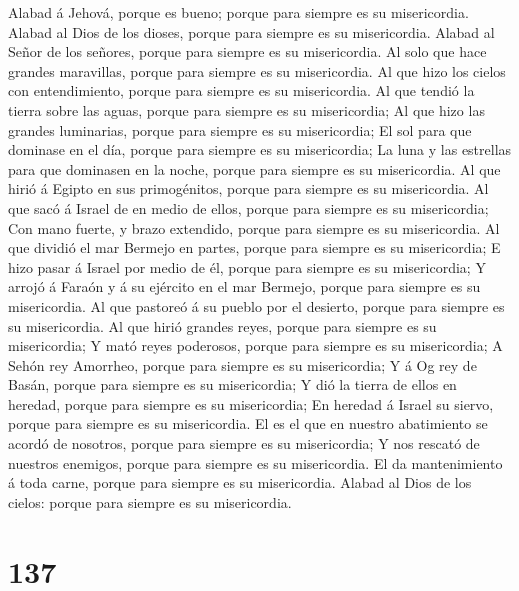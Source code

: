  Alabad á Jehová, porque es bueno; porque para siempre es su
misericordia.  Alabad al Dios de los dioses, porque para
siempre es su misericordia.  Alabad al Señor de los señores,
porque para siempre es su misericordia.  Al solo que hace
grandes maravillas, porque para siempre es su misericordia. 
Al que hizo los cielos con entendimiento, porque para siempre es su
misericordia.  Al que tendió la tierra sobre las aguas,
porque para siempre es su misericordia;  Al que hizo las
grandes luminarias, porque para siempre es su misericordia; 
El sol para que dominase en el día, porque para siempre es su
misericordia;  La luna y las estrellas para que dominasen en
la noche, porque para siempre es su misericordia.  Al que
hirió á Egipto en sus primogénitos, porque para siempre es su
misericordia.  Al que sacó á Israel de en medio de ellos,
porque para siempre es su misericordia;  Con mano fuerte, y
brazo extendido, porque para siempre es su misericordia. 
Al que dividió el mar Bermejo en partes, porque para siempre es su
misericordia;  E hizo pasar á Israel por medio de él,
porque para siempre es su misericordia;  Y arrojó á Faraón
y á su ejército en el mar Bermejo, porque para siempre es su
misericordia.  Al que pastoreó á su pueblo por el desierto,
porque para siempre es su misericordia.  Al que hirió
grandes reyes, porque para siempre es su misericordia;  Y
mató reyes poderosos, porque para siempre es su misericordia;
 A Sehón rey Amorrheo, porque para siempre es su
misericordia;  Y á Og rey de Basán, porque para siempre es
su misericordia;  Y dió la tierra de ellos en heredad,
porque para siempre es su misericordia;  En heredad á
Israel su siervo, porque para siempre es su misericordia. 
El es el que en nuestro abatimiento se acordó de nosotros, porque para
siempre es su misericordia;  Y nos rescató de nuestros
enemigos, porque para siempre es su misericordia.  El da
mantenimiento á toda carne, porque para siempre es su misericordia.
 Alabad al Dios de los cielos: porque para siempre es su
misericordia.

\hypertarget{section-136}{%
\section{137}\label{section-136}}

